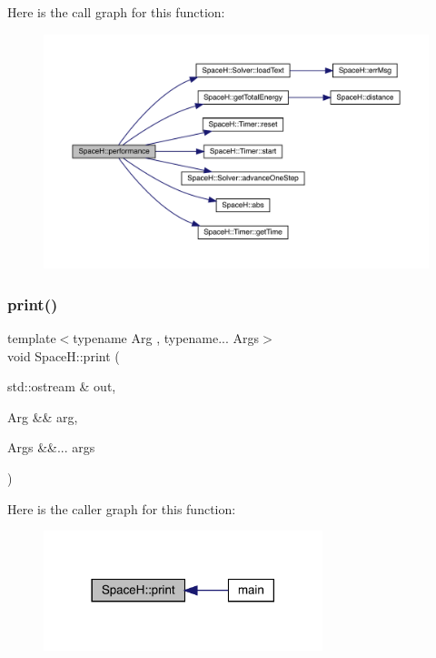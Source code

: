 Here is the call graph for this function\+:
\nopagebreak
\begin{figure}[H]
\begin{center}
\leavevmode
\includegraphics[width=350pt]{namespace_space_h_a49b8d303aa5a0ac25f38b91ae20bb721_cgraph}
\end{center}
\end{figure}
\mbox{\label{namespace_space_h_a6385589ed6d5605c4937955f10f6a03f}} 
\subsubsection{\texorpdfstring{print()}{print()}}
{\footnotesize\ttfamily template$<$typename Arg , typename... Args$>$ \\
void Space\+H\+::print (\begin{DoxyParamCaption}\item[{std\+::ostream \&}]{out,  }\item[{Arg \&\&}]{arg,  }\item[{Args \&\&...}]{args }\end{DoxyParamCaption})}

Here is the caller graph for this function\+:
\nopagebreak
\begin{figure}[H]
\begin{center}
\leavevmode
\includegraphics[width=230pt]{namespace_space_h_a6385589ed6d5605c4937955f10f6a03f_icgraph}
\end{center}
\end{figure}
\mbox{\label{namespace_space_h_aaed936948bcfcfbdb0154ccd6b738f3b}} 
